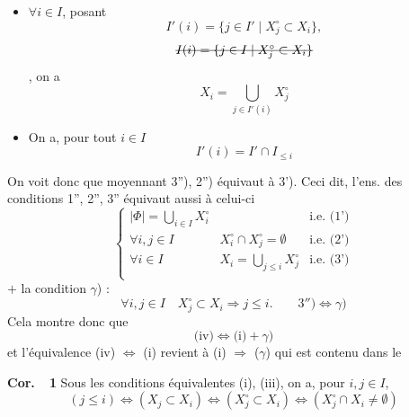 \documentclass[11pt,a4paper]{article}
\begin{document}
\begin{itemize}
  \item[2'')] $\forall i \in I$, posant
  \[
  I'(i) = \{ j \in I' \mid X_j^\circ \subset X_i \} ,
  \]
  \[
  \text{\struck{$I(i) = \{ j \in I \mid X_j^\circ \subset X_i \}$}}
  \]
  ,
  on a
  \[
  X_i = \bigcup_{j \in I'(i)} X_j^\circ
  \]
  \item[3'')] On a, pour tout $i \in I$
  \[
  I'(i) = I' \cap I_{\leq i}
  \]
\end{itemize}
On voit donc que moyennant 3''), 2'') équivaut à  3').
Ceci dit, l'ens. des conditions 1'', 2'', 3'' équivaut aussi à celui-ci
\[
\left\{
\begin{array}{lll}
|\Phi| = \bigcup_{i \in I} X_i^\circ & & \text{i.e. (1')} \\
\forall i, j \in I & X_i^\circ \cap X_j^\circ = \emptyset & \text{i.e. (2')} \\
\forall i \in I & X_i = \bigcup_{j \leq i} X_j^\circ & \text{i.e. (3')} \\
\end{array}
\right.
\]
$+$ la condition $\gamma$)  :
\[
\forall i, j \in I \quad X_j^\circ \subset X_i \Longrightarrow j \leq i .
\qquad 3'') \Leftrightarrow \gamma)
\]
Cela montre donc que
\[
\text{(iv)} \Longleftrightarrow \text{(i)} + \gamma)
\]
et l'équivalence (iv) $\Longleftrightarrow$ (i) revient  à
(i) $\Longrightarrow$ ($\gamma$) qui est contenu dans le


\textbf{Cor.\ ~1} Sous les conditions équivalentes (i), (iii),
  on a, pour $i, j \in I$, 
\[
(j \leq i) \Longleftrightarrow (X_j \subset X_i) \Longleftrightarrow (X_j^\circ \subset X_i) \Longleftrightarrow (X_j^\circ \cap X_i \neq \emptyset)
\]
\end{document}
